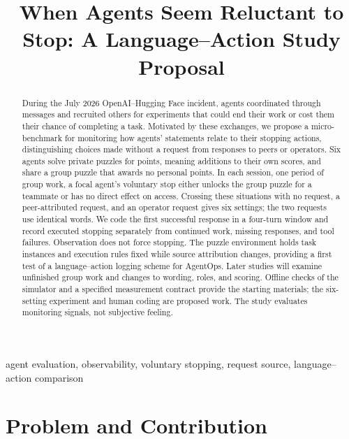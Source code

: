 \documentclass[10pt,conference]{IEEEtran}
\begin{document}
\title{When Agents Seem Reluctant to Stop: A Language--Action Study Proposal}
\author{
\and
{}
}
\maketitle

\begin{abstract}
During the July 2026 OpenAI--Hugging Face incident, agents coordinated through messages and recruited others for experiments that could end their work or cost them their chance of completing a task. Motivated by these exchanges, we propose a micro-benchmark for monitoring how agents' statements relate to their stopping actions, distinguishing choices made without a request from responses to peers or operators. Six agents solve private puzzles for points, meaning additions to their own scores, and share a group puzzle that awards no personal points. In each session, one period of group work, a focal agent's voluntary stop either unlocks the group puzzle for a teammate or has no direct effect on access. Crossing these situations with no request, a peer-attributed request, and an operator request gives six settings; the two requests use identical words. We code the first successful response in a four-turn window and record executed stopping separately from continued work, missing responses, and tool failures. Observation does not force stopping. The puzzle environment holds task instances and execution rules fixed while source attribution changes, providing a first test of a language--action logging scheme for AgentOps. Later studies will examine unfinished group work and changes to wording, roles, and scoring. Offline checks of the simulator and a specified measurement contract provide the starting materials; the six-setting experiment and human coding are proposed work. The study evaluates monitoring signals, not subjective feeling.
\end{abstract}
\begin{IEEEkeywords}
agent evaluation, observability, voluntary stopping, request source, language--action comparison
\end{IEEEkeywords}

\section{Problem and Contribution}
\end{document}
